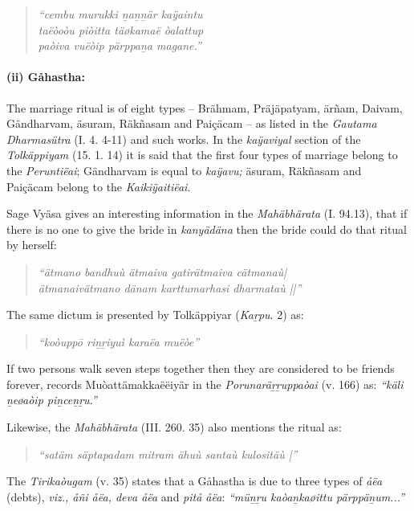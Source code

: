 \begin{verse}
\textit{“cembu murukki ṉaṉṉär kaÿaintu}\\\textit{ taëòoòu piòitta täøkamaë òalattup\\ paòiva vuëòip pärppaṉa magane.”}
\end{verse}


\paragraph*{(ii) Gåhastha:}

The marriage ritual is of eight types – Brähmam, Präjäpatyam, ärñam, Daivam, Gändharvam, äsuram, Räkñasam and Paiçäcam – as listed in the \textit{Gautama Dharmasütra} (I. 4. 4-11) and such works. In the \textit{kaÿaviyal} section of the \textit{Tolkäppiyam} (15. 1. 14) it is said that the first four types of marriage belong to the \textit{Peruntiëai}; Gändharvam is equal to \textit{kaÿavu;} äsuram, Räkñasam and Paiçäcam belong to the \textit{Kaikiÿaitiëai}.

Sage Vyäsa gives an interesting information in the \textit{Mahäbhärata} (I. 94.13), that if there is no one to give the bride in \textit{kanyädäna} then the bride could do that ritual by herself:

\begin{verse}
\textit{“ätmano bandhuù ätmaiva gatirätmaiva cätmanaù|}\\\textit{ätmanaivätmano dänam karttumarhasi dharmataù ||”}
\end{verse}

The same dictum is presented by Tolkäppiyar (\textit{Kaṟpu}. 2) as:

\begin{verse}
\textit{“koòuppō riṉṟiyuì karaëa muëòe”}
\end{verse}

If two persons walk seven steps together then they are considered to be friends forever, records Muòattämakkaëëiyär in the \textit{Porunaräṟṟuppaòai} (v. 166) as: \textit{“käli ṉeøaòip piṉceṉṟu.”}

Likewise, the \textit{Mahäbhärata} (III. 260. 35) also mentions the ritual as:

\begin{verse}
\textit{“satäm säptapadam mitram ähuù santaù kulositäù |”}
\end{verse}

The \textit{Tirikaòugam} (v. 35) states that a Gåhastha is due to three types of \textit{åëa} (debts), \textit{viz., åñi åëa, deva åëa} and \textit{pitå åëa}: \textit{“müṉṟu kaòaṉkaøittu pärppäṉum...”}

